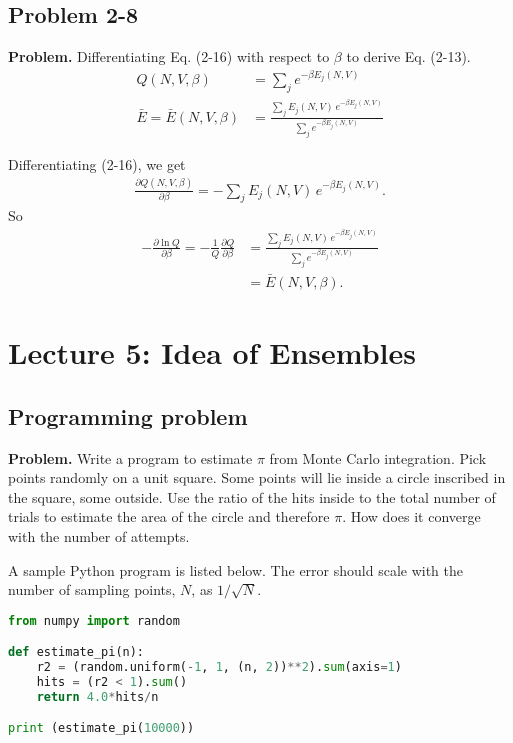 \documentclass[twocolumn, 10pt]{article}
\numberwithin{equation}{section}
\newenvironment{problem}
{\par\medskip \color{problemblue}
  \textbf{Problem. }\ignorespaces}
{\medskip}
\newenvironment{solution}[1][\empty]
{\par\medskip\sffamily
  \textbf{\ifx\empty#1{Solution.}\relax\else{#1}\fi} \ignorespaces}
{\medskip}
\begin{document}
\subsection{Problem 2-8}

\begin{problem}
  Differentiating Eq. (2-16) with respect to $\beta$
  to derive Eq. (2-13).
  \begin{align}
    Q(N, V, \beta)
    &= \sum_j e^{-\beta E_j(N, V)}
    \tag{2-16}
    \\
    \bar E = \bar E(N, V, \beta)
    &=
    \frac{ \sum_j E_j(N, V) \, e^{-\beta E_j(N, V)} }
         { \sum_j e^{-\beta E_j(N, V) } }
    \tag{2-13}
  \end{align}
\end{problem}

\begin{solution}
Differentiating (2-16), we get
\begin{align*}
  \frac{ \partial Q(N, V, \beta) } { \partial \beta }
  = -\sum_j E_j(N, V) \, e^{-\beta E_j(N, V)}.
\end{align*}
So
\begin{align*}
  -\frac{ \partial \ln Q } { \partial \beta }
  =
  -\frac{1}{Q}
  \frac{ \partial Q } { \partial \beta }
  &=
  \frac{ \sum_j E_j(N, V) \, e^{-\beta E_j(N, V)} }
       { \sum_j e^{-\beta E_j(N, V)} }
  \\
  &=\bar E(N, V, \beta)
  .
\end{align*}
\end{solution}


\section{Lecture 5: Idea of Ensembles}

\subsection{Programming problem}

\begin{problem}
Write a program to estimate $\pi$ from Monte Carlo integration.
%
Pick points randomly on a unit square.
%
Some points will lie inside a circle inscribed in the square,
some outside.
%
Use the ratio of the hits inside to the total number of trials
to estimate the area of the circle and therefore $\pi$.
%
How does it converge with the number of attempts.
\end{problem}

\begin{solution}
A sample Python program is listed below.
The error should scale
with the number of sampling points, $N$,
as $1/\sqrt N$.
%
\begin{lstlisting}[language=Python]
from numpy import random

def estimate_pi(n):
    r2 = (random.uniform(-1, 1, (n, 2))**2).sum(axis=1)
    hits = (r2 < 1).sum()
    return 4.0*hits/n

print (estimate_pi(10000))
\end{lstlisting}
%
\end{solution}
\end{document}
